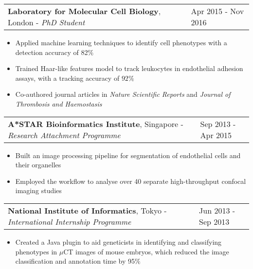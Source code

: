 \documentclass[11pt]{res}
\begin{document}
\vspace{-1.0em}
\begin{tabular}{@{} p{13.7cm} p{3.5cm} @{}} {\bf Laboratory for Molecular Cell Biology}, London - \emph{PhD Student} & Apr 2015 - Nov 2016 \end{tabular}
\begin{addmargin}[0em]{0em}
\vspace{-1.0em}
\textcolor{mygray}{
\begin{itemize} %
\item Applied machine learning techniques to identify cell phenotypes with a detection accuracy of 82$\%$
\item Trained Haar-like features model to track leukocytes in endothelial adhesion assays, with a tracking accuracy of $92\%$
\item Co-authored journal articles in \emph{Nature Scientific Reports} and \emph{Journal of Thrombosis and Haemostasis}
\end{itemize}
}
\end{addmargin}
\vspace{-1.0em}
\begin{tabular}{@{} p{13.7cm} p{3.5cm} @{}} {\bf A*STAR Bioinformatics Institute}, Singapore - \emph{Research Attachment Programme} & Sep 2013 - Apr 2015 \end{tabular}
\begin{addmargin}[0em]{0em}
\vspace{-1.0em}
\textcolor{mygray}{
\begin{itemize} %
\item Built an image processing pipeline for segmentation of endothelial cells and their organelles
\item Employed the workflow to analyse over 40 separate high-throughput confocal imaging studies
\end{itemize}
}
\end{addmargin}
\vspace{-1.0em}
\begin{tabular}{@{} p{13.7cm} p{3.5cm} @{}} {\bf National Institute of Informatics}, Tokyo - \emph{International Internship Programme} & Jun 2013 - Sep 2013\end{tabular}
\begin{addmargin}[0em]{0em}
\vspace{-1.0em}
\textcolor{mygray}{
\begin{itemize} %
\item \textmd{Created a Java plugin to aid geneticists in identifying and classifying phenotypes in $\mu$CT images of mouse embryos, which reduced the image classification and annotation time by 95$\%$}
\end{itemize}
}
\end{addmargin}
\end{document}
